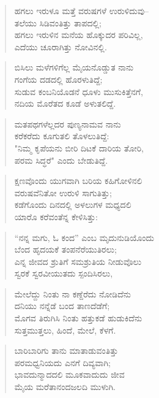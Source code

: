 \begin{verse}
ಹಗಲು ಇರುಳೂ ಮತ್ತೆ ವರುಷಗಳೆ ಉರುಳಿದುವು–\\ತಲೆಯು ಸಿಡಿವಂತಿತ್ತು ತಾಪದಲ್ಲಿ; \\ಹಗಲು ಇರುಳಿನ ಮನೆಯ ಹೊಕ್ಕುದರ ಪರಿವಿಲ್ಲ,\\ಎದೆಯು ಚೂರಾಗಿತ್ತು ನೋವಿನಲ್ಲಿ.
\end{verse}

\begin{verse}
ಬಿಸಿಲು ಮಳೆಗಳಿಗೆಲ್ಲ ಮೈಯನೊಡ್ಡುತ ನಾನು\\ಗಂಗೆಯ ದಡದಲ್ಲಿ ಹೊರಳುತಿದ್ದೆ;\\ಸುಡುವ ಕಂಬನಿಯೊಡನೆ ಧೂಳು ಮುಸುಕಿತ್ತೆನಗೆ,\\ನದಿಯ ಮೊರೆತದ ಕೂಡೆ ಅಳುತಲಿದ್ದೆ.
\end{verse}

\begin{verse}
ಮತಪಥಗಳೆಲ್ಲದರ ಪುಣ್ಯನಾಮವ ನಾನು\\ಕರೆಕರೆದು ಕೂಗುತಲಿ ತೊಳಲುತಿದ್ದೆ:\\"ನಿಮ್ಮ ಕೃಪೆಯನು ಬೀರಿ ದಿಟಕೆ ದಾರಿಯ ತೋರಿ,\\ಪರಮ ಸಿದ್ಧರೆ" ಎಂದು ಬೇಡುತಿದ್ದೆ. 
\end{verse}

\begin{verse}
ಕ್ಷಣವೊಂದು ಯುಗವಾಗಿ ಬರಿಯ ಕಹಿಗೋಳಿನಲಿ\\ವರುಷವೆನಿತೋ ಉರುಳಿ ಸಾಗುತಿತ್ತು;\\ಕಡೆಗೊಂದು ದಿನದಲ್ಲಿ ಅಳಲುಗಳ ಮಧ್ಯದಲಿ\\ಯಾರೊ ಕರೆವಂತೆನ್ನ ಕೇಳಿಸಿತ್ತು:
\end{verse}

\begin{verse}
“ನನ್ನ ಮಗು, ಓ ಕಂದ” ಎಂಬ ಮೃದುನುಡಿಯೊಂದು\\ಬೆಂದ ಹೃದಯಕೆ ತಂಪನೆರೆಯುತಿರಲು;\\ಎನ್ನ ಜೀವದ ಶ್ರುತಿಗೆ ಸಮಶ್ರುತಿಯ ನೀಡುವೊಲು\\ಸ್ವರಕೆ ಸ್ವರವೀಯುತದು ಸ್ಪಂದಿಸಿರಲು,
\end{verse}

\begin{verse}
ಮೇಲೆದ್ದು ನಿಂತು ನಾ ಕಣ್ದೆರೆದು ನೋಡಿದೆನು\\ದನಿಯು ನನ್ನೆಡೆ ಬಂದ ತಾಣದೆಡೆಗೆ; \\ಮೊಗವ ತಿರುಗಿಸಿ ನಿಂತು ಹತ್ತುಕಡೆ ಹುಡುಕಿದೆನು\\ಸುತ್ತಮುತ್ತಲು, ಹಿಂದೆ, ಮೇಲೆ, ಕೆಳಗೆ.
\end{verse}

\begin{verse}
ಬಾರಿಬಾರಿಗು ತಾನು ಮಾತಾಡುವಂತಿತ್ತು\\ಪರಮಧ್ವನಿಯದು ಎನಗೆ ದಿವ್ಯವಾಗಿ;\\ಭಾವದುನ್ಮಾದದಲಿ ಮೂಕವಾದುದು ಜೀವ\\ಮೈಯ ಮರೆತಾನಂದಜಲದಿ ಮುಳುಗಿ.
\end{verse}

